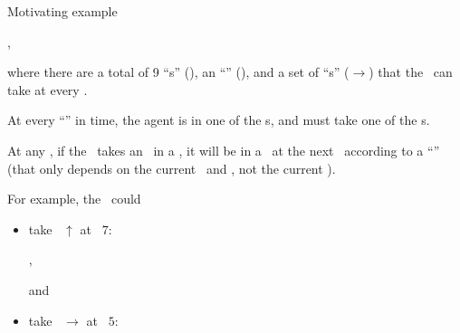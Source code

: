 \documentclass{rl_theory/rl_theory}
\begin{document}
\begin{part} {Motivating example}
\begin{center}
,
  \end{center}
  where there are a total of 9 ``\til{}s'' (), 
  an ``\agt'' (), and
  a set of ``\act{}s'' ($\rightarrow$) that the \agt\ can take at every \til.

  At every ``\stp'' in time, the agent is in one of the \til{}s,
  and must take one of the \act{}s. 

  At any \stp, if the \agt\ takes an \act\ in a \til, 
  it will be in a \til\ at the next \stp\ according to a ``\trd''
  (that only depends on the current \til\ and \act, not the current \stp).

  For example, the \agt\ could
  \begin{itemize}
    \def\tilesep{3.2}
    \def\tscale{0.6}
    \item take \act\ $\uparrow$ at \til\ $7$:
      \begin{center}
        ,
      \end{center}
      and
    \item take \act\ $\rightarrow$ at \til\ $5$:
      \begin{center}
\end{center}
\end{itemize}
\end{part}
\end{document}
